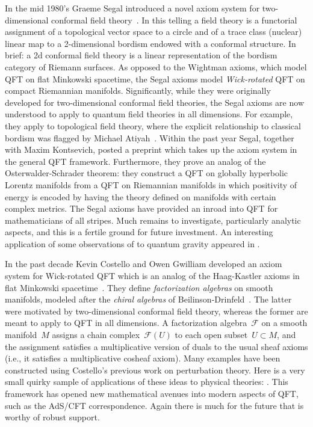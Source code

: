 \documentclass[12pt]{article}
\begin{document}
In the mid 1980's Graeme Segal introduced a novel axiom system for
two-dimensional conformal field theory~\cite{SegalCFT}.  In this telling a field theory
is a functorial assignment of a topological vector space to a circle and of a
trace class (nuclear) linear map to a 2-dimensional bordism endowed with a
conformal structure.  In brief: a 2d conformal field theory is a linear
representation of the bordism category of Riemann surfaces.  As opposed to
the Wightman axioms, which model QFT on flat Minkowski spacetime, the Segal
axioms model \emph{Wick-rotated} QFT on compact Riemannian manifolds.
Significantly, while they were originally developed for two-dimensional
conformal field theories, the Segal axioms are now understood to apply to quantum field
theories in all dimensions.  For example, they apply to topological field theory,
where the explicit relationship to classical bordism was flagged by Michael Atiyah~\cite{Atiyah}.
Within the past year Segal, together
with Maxim Kontsevich, posted a preprint \cite{Kontsevich:2021dmb} which takes up
the axiom system in the general QFT framework.  Furthermore, they prove an
analog of the Osterwalder-Schrader theorem: they construct a QFT on globally
hyperbolic Lorentz manifolds from a QFT on Riemannian manifolds in which
positivity of energy is encoded by having the theory defined on manifolds
with certain complex metrics.  The Segal axioms have provided an inroad into
QFT for mathematicians of all stripes.  Much remains to investigate,
particularly analytic aspects, and this is a fertile ground for future
investment. An interesting application of some observations of \cite{Kontsevich:2021dmb} to   
quantum gravity appeared in \cite{Witten:2021nzp}.

 
In the past decade Kevin Costello and Owen Gwilliam developed an axiom system
for Wick-rotated QFT which is an analog of the Haag-Kastler axioms in flat
Minkowski spacetime~\cite{Costello:2016vjw,CostelloGwilliam2}.  They define
\emph{factorization algebras} on smooth manifolds, modeled after the
\emph{chiral algebras} of Beilinson-Drinfeld~\cite{BeilinsonDrinfeld}.  The
latter were motivated by two-dimensional conformal field theory, whereas the
former are meant to apply to QFT in all dimensions.  A factorization
algebra~$\mathcal{F}$ on a smooth manifold~$M$ assigns a chain
complex~$\mathcal{F}(U)$ to each open subset~$U\subset M$, and the assignment
satisfies a multiplicative version of duals to the usual sheaf axioms (i.e.,
it satisfies a multiplicative cosheaf axiom).  Many examples have been
constructed using Costello's previous work on perturbation theory.  
Here is a very small quirky
sample of applications of these ideas to physical theories: 
\cite{CoLi,MR3869646,MR3869645,Costello:2017dso,MR4310891, Koszul2021,Costello:2022wso}.  This
framework has opened new mathematical avenues into modern aspects of QFT,
such as the AdS/CFT correspondence.  Again there is much for the future that
is worthy of robust support.
\end{document}
